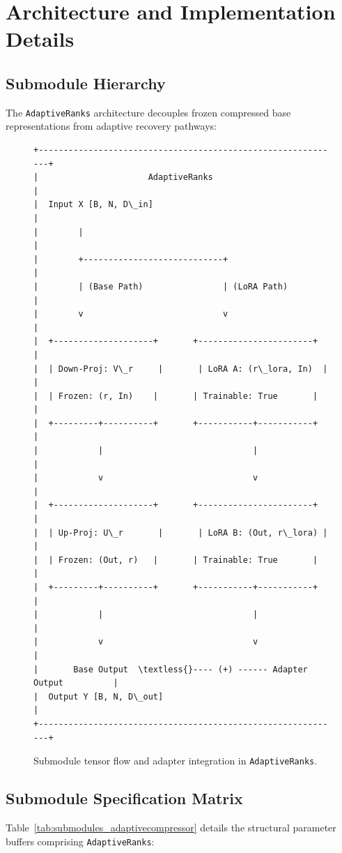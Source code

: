 \section{Architecture and Implementation Details}

\subsection{Submodule Hierarchy}
The \texttt{AdaptiveRanks} architecture decouples frozen compressed base representations from adaptive recovery pathways:

\begin{figure}[H]
\centering
\begin{verbatim}
+-------------------------------------------------------------+
|                      AdaptiveRanks                          |
|  Input X [B, N, D\_in]                                       |
|        |                                                    |
|        +----------------------------+                       |
|        | (Base Path)                | (LoRA Path)           |
|        v                            v                       |
|  +--------------------+       +-----------------------+     |
|  | Down-Proj: V\_r     |       | LoRA A: (r\_lora, In)  |     |
|  | Frozen: (r, In)    |       | Trainable: True       |     |
|  +---------+----------+       +-----------+-----------+     |
|            |                              |                 |
|            v                              v                 |
|  +--------------------+       +-----------------------+     |
|  | Up-Proj: U\_r       |       | LoRA B: (Out, r\_lora) |     |
|  | Frozen: (Out, r)   |       | Trainable: True       |     |
|  +---------+----------+       +-----------+-----------+     |
|            |                              |                 |
|            v                              v                 |
|       Base Output  \textless{}---- (+) ------ Adapter Output          |
|  Output Y [B, N, D\_out]                                     |
+-------------------------------------------------------------+
\end{verbatim}
\caption{Submodule tensor flow and adapter integration in \texttt{AdaptiveRanks}.}
\end{figure}

\subsection{Submodule Specification Matrix}
Table~\ref{tab:submodules_adaptivecompressor} details the structural parameter buffers comprising \texttt{AdaptiveRanks}:

